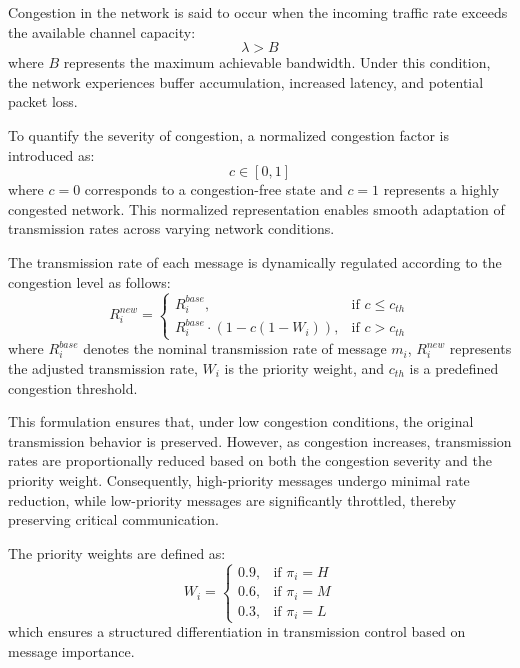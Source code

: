 \documentclass[pdflatex,sn-mathphys-num]{sn-jnl}%
\theoremstyle{thmstyleone}%
\theoremstyle{thmstyletwo}%
\theoremstyle{thmstylethree}%
\begin{document}
Congestion in the network is said to occur when the incoming traffic rate exceeds the available channel capacity:
\begin{equation}
\lambda > B
\label{eq:congestion_condition}
\end{equation}
where $B$ represents the maximum achievable bandwidth. Under this condition, the network experiences buffer accumulation, increased latency, and potential packet loss.

To quantify the severity of congestion, a normalized congestion factor is introduced as:
\begin{equation}
c \in [0,1]
\label{eq:congestion_factor}
\end{equation}
where $c=0$ corresponds to a congestion-free state and $c=1$ represents a highly congested network. This normalized representation enables smooth adaptation of transmission rates across varying network conditions.

The transmission rate of each message is dynamically regulated according to the congestion level as follows:
\begin{equation}
R_i^{new} = 
\begin{cases}
R_i^{base}, & \text{if } c \leq c_{th} \\
R_i^{base} \cdot (1 - c(1 - W_i)), & \text{if } c > c_{th}
\end{cases}
\label{eq:rate_control}
\end{equation}
where $R_i^{base}$ denotes the nominal transmission rate of message $m_i$, $R_i^{new}$ represents the adjusted transmission rate, $W_i$ is the priority weight, and $c_{th}$ is a predefined congestion threshold.

This formulation ensures that, under low congestion conditions, the original transmission behavior is preserved. However, as congestion increases, transmission rates are proportionally reduced based on both the congestion severity and the priority weight. Consequently, high-priority messages undergo minimal rate reduction, while low-priority messages are significantly throttled, thereby preserving critical communication.

The priority weights are defined as:
\begin{equation}
W_i =
\begin{cases}
0.9, & \text{if } \pi_i = H \\
0.6, & \text{if } \pi_i = M \\
0.3, & \text{if } \pi_i = L
\end{cases}
\label{eq:priority_weight}
\end{equation}
which ensures a structured differentiation in transmission control based on message importance.
\end{document}
